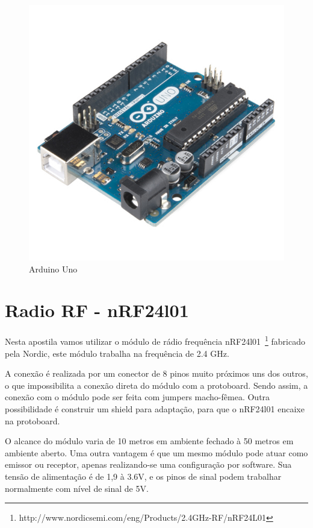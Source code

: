 \begin{figure}[ht]
      \centering
      \includegraphics[scale=0.35]{figuras/arduino.jpg}
      \caption{Arduino Uno}
      \label{fig:arduino}
\end{figure}



\section{Radio RF - nRF24l01}

Nesta apostila vamos utilizar o módulo de rádio frequência nRF24l01~\footnote{http://www.nordicsemi.com/eng/Products/2.4GHz-RF/nRF24L01} fabricado pela Nordic, este módulo trabalha na frequência de 2.4 GHz.

A conexão é realizada por um conector de 8 pinos muito próximos uns dos outros, o que impossibilita a conexão direta do módulo com a protoboard. Sendo assim, a conexão com o módulo pode ser feita com jumpers macho-fêmea. Outra possibilidade é construir um shield para adaptação, para que o nRF24l01 encaixe na protoboard.

O alcance do módulo varia de 10 metros em ambiente fechado à 50 metros em ambiente aberto. Uma outra vantagem é que um mesmo módulo pode atuar como emissor ou receptor, apenas realizando-se uma configuração por software. Sua tensão de alimentação é de 1,9 à 3.6V, e os pinos de sinal podem trabalhar normalmente com nível de sinal de 5V. 

